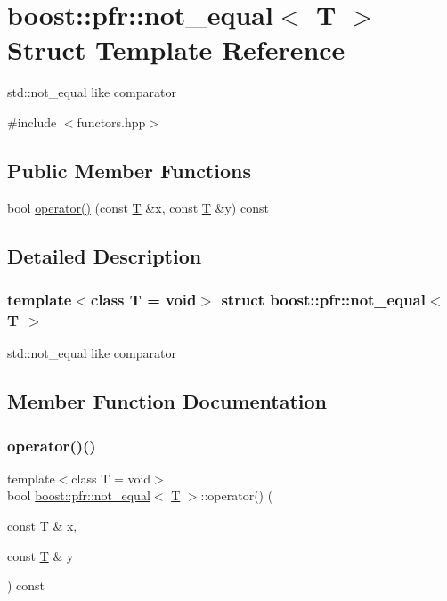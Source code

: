 \hypertarget{structboost_1_1pfr_1_1not__equal}{}\section{boost\+:\+:pfr\+:\+:not\+\_\+equal$<$ T $>$ Struct Template Reference}
\label{structboost_1_1pfr_1_1not__equal}


std\+::not\+\_\+equal like comparator  




{\ttfamily \#include $<$functors.\+hpp$>$}

\subsection*{Public Member Functions}
\begin{DoxyCompactItemize}
\item 
bool \mbox{\hyperlink{structboost_1_1pfr_1_1not__equal_a4af33460a027925b8d49e78f5549af19}{operator()}} (const \mbox{\hyperlink{struct_t}{T}} \&x, const \mbox{\hyperlink{struct_t}{T}} \&y) const
\end{DoxyCompactItemize}


\subsection{Detailed Description}
\subsubsection*{template$<$class T = void$>$\newline
struct boost\+::pfr\+::not\+\_\+equal$<$ T $>$}

std\+::not\+\_\+equal like comparator 

\subsection{Member Function Documentation}
\mbox{\label{structboost_1_1pfr_1_1not__equal_a4af33460a027925b8d49e78f5549af19}} 
\subsubsection{\texorpdfstring{operator()()}{operator()()}}
{\footnotesize\ttfamily template$<$class T  = void$>$ \\
bool \mbox{\hyperlink{structboost_1_1pfr_1_1not__equal}{boost\+::pfr\+::not\+\_\+equal}}$<$ \mbox{\hyperlink{struct_t}{T}} $>$\+::operator() (\begin{DoxyParamCaption}\item[{const \mbox{\hyperlink{struct_t}{T}} \&}]{x,  }\item[{const \mbox{\hyperlink{struct_t}{T}} \&}]{y }\end{DoxyParamCaption}) const\hspace{0.3cm}{\ttfamily [inline]}}

